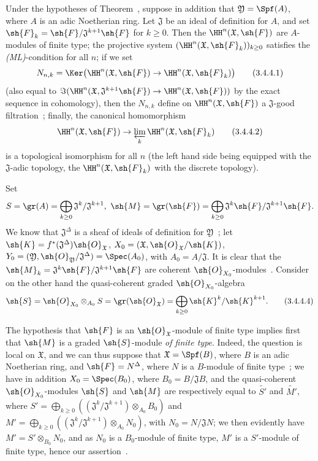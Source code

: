 \begin{corollary}[3.4.4]
\label{III.3.4.4}
Under the hypotheses of Theorem~, suppose in addition that $\mathfrak{Y}=\Spf(A)$, where $A$ is an adic Noetherian ring.
Let $\mathfrak{J}$ be an ideal of definition for $A$, and set $\sh{F}_k=\sh{F}/\mathfrak{J}^{k+1}\sh{F}$ for $k\geq 0$.
Then the $\HH^n(\mathfrak{X},\sh{F})$ are $A$-modules of finite type; the projective system $(\HH^n(\mathfrak{X},\sh{F}_k))_{k\geq 0}$ satisfies the \emph{(ML)}-condition for all $n$; if we set
\[
\label{III.3.4.4.1}
  N_{n,k}=\Ker\big(\HH^n(\mathfrak{X},\sh{F})\to\HH^n(\mathfrak{X},\sh{F}_k)\big)
  \tag{3.4.4.1}
\]
(also equal to $\Im(\HH^n(\mathfrak{X},\mathfrak{J}^{k+1}\sh{F})\to\HH^n(\mathfrak{X},\sh{F}))$ by the exact sequence in cohomology), then the $N_{n,k}$ define on $\HH^n(\mathfrak{X},\sh{F})$ a $\mathfrak{J}$-good filtration~; finally, the canonical homomorphism
\[
\label{III.3.4.4.2}
  \HH^n(\mathfrak{X},\sh{F})\to\varprojlim_k\HH^n(\mathfrak{X},\sh{F}_k)
  \tag{3.4.4.2}
\]
is a topological isomorphism for all $n$ (the left hand side being equipped with the $\mathfrak{J}$-adic topology, the $\HH^n(\mathfrak{X},\sh{F}_k)$ with the discrete topology).
\end{corollary}

Set
\[
\label{III.3.4.4.3}
  S=\gr(A)=\bigoplus_{k\geq 0}\mathfrak{J}^k/\mathfrak{J}^{k+1},\ \sh{M}=\gr(\sh{F})=\bigoplus_{k\geq 0}\mathfrak{J}^k\sh{F}/\mathfrak{J}^{k+1}\sh{F}.
\]
We know that $\mathfrak{J}^\Delta$ is a sheaf of ideals of definition for $\mathfrak{Y}$~; let $\sh{K}=f^*(\mathfrak{J}^\Delta)\sh{O}_\mathfrak{X}$, $X_0=(\mathfrak{X},\sh{O}_\mathfrak{X}/\sh{K})$, $Y_0=(\mathfrak{Y},\sh{O}_\mathfrak{Y}/\mathfrak{J}^\Delta)=\Spec(A_0)$, with $A_0=A/\mathfrak{J}$.
It is clear that the $\sh{M}_k=\mathfrak{J}^k\sh{F}/\mathfrak{J}^{k+1}\sh{F}$ are coherent $\sh{O}_{X_0}$-modules~.
Consider on the other hand the quasi-coherent graded $\sh{O}_{X_0}$-algebra
\[
\label{III.3.4.4.4}
  \sh{S}=\sh{O}_{X_0}\otimes_{A_0}S=\gr(\sh{O}_\mathfrak{X})=\bigoplus_{k\geq 0}\sh{K}^k/\sh{K}^{k+1}.
  \tag{3.4.4.4}
\]

The hypothesis that $\sh{F}$ is an $\sh{O}_\mathfrak{X}$-module of finite type implies first that $\sh{M}$ is
a graded $\sh{S}$-module \emph{of finite type}.
Indeed, the question is local on $\mathfrak{X}$, and we can thus suppose that $\mathfrak{X}=\Spf(B)$, where $B$ is an adic Noetherian ring, and $\sh{F}=N^\Delta$, where $N$ is a $B$-module of finite type~; we have in addition $X_0=\Spec(B_0)$, where $B_0=B/\mathfrak{J}B$, and the quasi-coherent $\sh{O}_{X_0}$-modules $\sh{S}$ and $\sh{M}$ are respectively equal to $\widetilde{S'}$ and $\widetilde{M'}$, where $S'=\bigoplus_{k\geq 0}((\mathfrak{J}^k/\mathfrak{J}^{k+1})\otimes_{A_0}B_0)$ and $M'=\bigoplus_{k\geq 0}((\mathfrak{J}^k/\mathfrak{J}^{k+1})\otimes_{A_0}N_0)$, with $N_0=N/\mathfrak{J}N$; we then evidently have $M'=S'\otimes_{B_0}N_0$, and as $N_0$ is a $B_0$-module of finite type, $M'$ is a $S'$-module of finite type, hence our assertion~.

